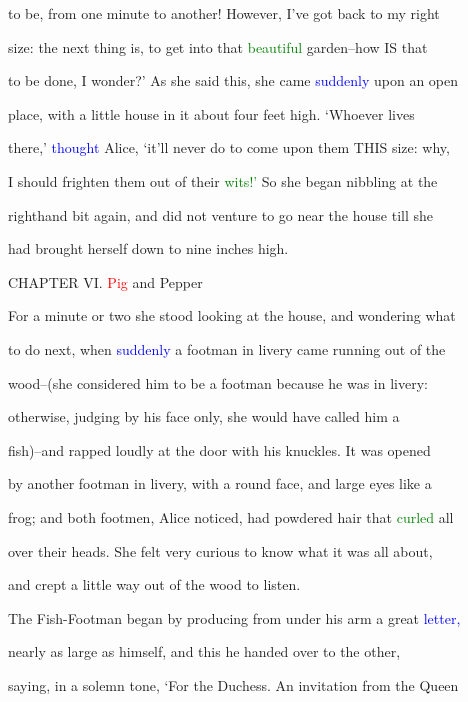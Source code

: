  to be, from one minute to another! However, I’ve got back to my right

 size: the next thing is, to get into that \textcolor{green}{beautiful} garden--how IS that

 to be done, I wonder?’ As she said this, she came \textcolor{blue}{suddenly} upon an open

 place, with a little house in it about four feet high. ‘Whoever lives

 there,’ \textcolor{blue}{thought} Alice, ‘it’ll never do to come upon them THIS size: why,

 I should \textcolor{BurntOrange}{frighten} them out of their \textcolor{green}{wits!’} So she began nibbling at the

 righthand bit again, and did not venture to go near the house till she

 had brought herself down to nine inches high.









 CHAPTER VI. \textcolor{red}{Pig} and Pepper



 For a minute or two she stood looking at the house, and wondering what

 to do next, when \textcolor{blue}{suddenly} a footman in livery came running out of the

 wood--(she considered him to be a footman because he was in livery:

 otherwise, judging by his face only, she would have called him a

 fish)--and rapped loudly at the door with his knuckles. It was opened

 by another footman in livery, with a round face, and large eyes like a

 frog; and both footmen, Alice noticed, had powdered hair that \textcolor{green}{curled} all

 over their heads. She felt very curious to know what it was all about,

 and crept a little way out of the wood to listen.



 The Fish-Footman began by producing from under his arm a great \textcolor{blue}{letter,}

 nearly as large as himself, and this he handed over to the other,

 saying, in a solemn tone, ‘For the Duchess. An \textcolor{BurntOrange}{invitation} from the Queen

